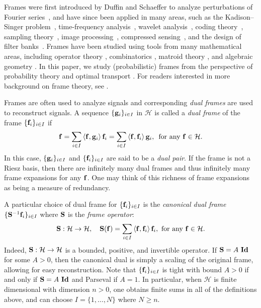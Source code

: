 \documentclass{amsart}
\numberwithin{equation}{section}
\newcommand\bof{{\bf f}}
\newcommand{\bS}{{\bf S}}
\newcommand{\bI}{{\bf Id}}
\theoremstyle{plain}
\theoremstyle{remark}
\theoremstyle{definition}
\begin{document}
Frames were first introduced by Duffin and Schaeffer to analyze perturbations of Fourier series~\cite{duffin1952class}, and have since been applied in many areas, such as the Kadison–Singer problem~\cite{casazza2013kadison}, time-frequency analysis~\cite{grochenig2001foundations},  wavelet analysis~\cite{daubechies1992ten},  coding theory~\cite{strohmer2003grassmannian}, sampling theory~\cite{eldar2003sampling}, 
image processing~\cite{kutyniok2012multiscale},  compressed sensing~\cite{naidu2020construction}, and the design of filter banks~\cite{fickus2013finite}.   
Frames have been studied using tools from many mathematical areas, including operator theory \cite{christensen2017operator}, combinatorics \cite{bownik2015combinatorial}, matroid theory \cite{bernstein2020algebraic}, and algebraic geometry \cite{cahill2013algebraic}. In this paper, we study (probabilistic) frames from the perspective of probability theory and optimal transport \cite{ehler2012random, ehler2013probabilistic, wickman2017duality, wickman2014optimal}.  
For readers interested in more background on frame theory, see \cite{christensen2016introduction}.



Frames are often used to analyze signals and corresponding \emph{dual frames} are used to reconstruct signals. A sequence $\{{\bf g}_i\}_{i \in I}$  in $\mathcal{H}$ is called a \textit{dual frame} of the frame $\{{\bf f}_i\}_{i \in I}$ if
\begin{equation}\label{eqn:dualexpansion}
   {\bf f} = \sum_{i \in I}  \left\langle {\bf f},{\bf g}_i \right\rangle  {\bf f}_i   = \sum_{i \in I}  \left\langle {\bf f},{\bf f}_i \right\rangle  {\bf g}_i, \enskip\text{for any ${\bf f} \in \mathcal{H}$}.
\end{equation}
In this case, $\{{\bf g}_i\}_{i \in I}$ and $\{{\bf f}_i\}_{i\in I}$ are said to be a \textit{dual pair}. If the frame is not a Riesz basis, then there are infinitely many dual frames and thus infinitely many frame expansions for any $\bof$. One may think of this richness of frame expansions as being a measure of redundancy.

A particular choice of dual frame for $\{{\bf f}_i\}_{i\in I}$ is the \emph{canonical dual frame} $\{{\bf S}^{-1}{\bf f}_i\}_{i \in I}$ where ${\bf S}$ is the \textit{frame operator}:
\begin{equation*}
    {\bf S}: \mathcal{H} \rightarrow \mathcal{H}, \ \ \ {\bf S}({\bf f}) = \sum_{i \in I}  \left\langle {\bf f},{\bf f}_i \right\rangle  {\bf f}_i, \ \text{for any} \ {\bf f} \in \mathcal{H}.
\end{equation*}
Indeed, ${\bf S}: \mathcal{H} \rightarrow \mathcal{H}$ is a bounded, positive, and invertible operator. If $\bS = A \ \bI$ for some $A>0$, then the canonical dual is simply a scaling of the original frame, allowing for easy reconstruction. Note that  $\{{\bf f}_i\}_{i \in I}$  is tight with bound $A>0$ if and only if $\bS = A \ \bI$ and Parseval if $A=1$. In particular, when $\mathcal{H}$ is finite dimensional with dimension $n>0$, one obtains finite sums in all of the definitions above, and can choose $I = \{1, \hdots, N\}$ where $N \geq n$.
\end{document}

